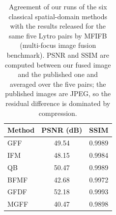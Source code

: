 \begin{table}[htbp]
\centering
\small
\setlength{\tabcolsep}{6pt}
\caption{Agreement of our runs of the six classical spatial-domain methods with the results released for the same five Lytro pairs by MFIFB (multi-focus image fusion benchmark). PSNR and SSIM are computed between our fused image and the published one and averaged over the five pairs; the published images are JPEG, so the residual difference is dominated by compression.}
\label{tab:supp_mfifb}
\begin{tabular}{lcc}
\toprule
Method & PSNR (dB) & SSIM \\
\midrule
GFF~\cite{li2013image} & 49.54 & 0.9989 \\
IFM~\cite{li2013matting} & 48.15 & 0.9984 \\
QB~\cite{bai2015quadtree} & 50.47 & 0.9989 \\
BFMF~\cite{zhang2017boundary} & 42.68 & 0.9972 \\
GFDF~\cite{qiu2019guided} & 52.18 & 0.9993 \\
MGFF~\cite{bavirisetti2019multiscale} & 40.47 & 0.9898 \\
\bottomrule
\end{tabular}
\end{table}

